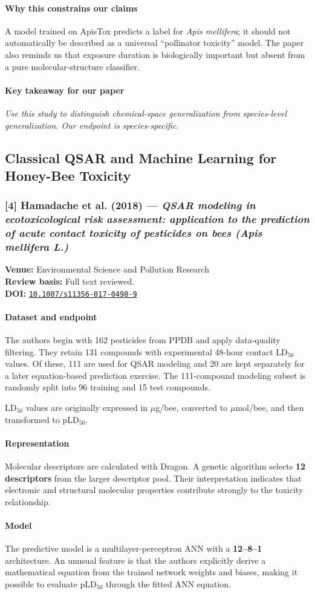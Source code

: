 \documentclass[11pt]{article}
\newcommand{\reviewfield}[2]{\paragraph{#1}#2}
\newcommand{\keytakeaway}[1]{\paragraph{Key takeaway for our paper}\emph{#1}}
\newcommand{\paperdoi}[1]{\href{https://doi.org/#1}{\texttt{#1}}}
\begin{document}
\reviewfield{Why this constrains our claims}{
A model trained on ApisTox predicts a label for \textit{Apis mellifera}; it should not automatically be described as a universal ``pollinator toxicity'' model. The paper also reminds us that exposure duration is biologically important but absent from a pure molecular-structure classifier.
}

\keytakeaway{Use this study to distinguish chemical-space generalization from species-level generalization. Our endpoint is species-specific.}

\subsection{Classical QSAR and Machine Learning for Honey-Bee Toxicity}

\subsubsection{[4] Hamadache et al. (2018) --- \textit{QSAR modeling in ecotoxicological risk assessment: application to the prediction of acute contact toxicity of pesticides on bees (Apis mellifera L.)}}
\textbf{Venue:} Environmental Science and Pollution Research\\
\textbf{Review basis:} Full text reviewed.\\
\textbf{DOI:} \paperdoi{10.1007/s11356-017-0498-9}

\reviewfield{Dataset and endpoint}{
The authors begin with 162 pesticides from PPDB and apply data-quality filtering. They retain 131 compounds with experimental 48-hour contact LD$_{50}$ values. Of these, 111 are used for QSAR modeling and 20 are kept separately for a later equation-based prediction exercise. The 111-compound modeling subset is randomly split into 96 training and 15 test compounds.

LD$_{50}$ values are originally expressed in $\mu$g/bee, converted to $\mu$mol/bee, and then transformed to pLD$_{50}$.
}

\reviewfield{Representation}{
Molecular descriptors are calculated with Dragon. A genetic algorithm selects \textbf{12 descriptors} from the larger descriptor pool. Their interpretation indicates that electronic and structural molecular properties contribute strongly to the toxicity relationship.
}

\reviewfield{Model}{
The predictive model is a multilayer-perceptron ANN with a \textbf{12--8--1} architecture. An unusual feature is that the authors explicitly derive a mathematical equation from the trained network weights and biases, making it possible to evaluate pLD$_{50}$ through the fitted ANN equation.
}
\end{document}

